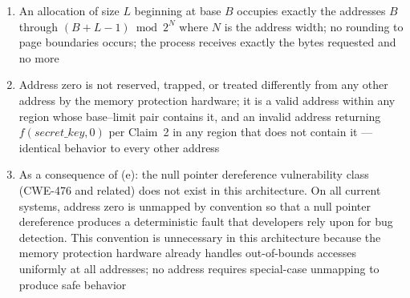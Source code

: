 \documentclass[12pt,letterpaper]{article}
\begin{document}
\begin{enumerate}[label=(\alph*),noitemsep]
        \textit{Note on naive implementation.}
        The intuitively obvious alternative --- two separate
        comparisons:
        \begin{lstlisting}
// WRONG: does not form a ring
if (address >= base && address < base + limit) { valid }
        \end{lstlisting}
        produces a linear region with two hard endpoints.
        It does not handle allocations that cross the wraparound
        boundary: an allocation beginning near the top of the
        address space and extending past $2^N - 1$ back toward
        zero will be incorrectly rejected or require an explicit
        branch to detect and handle the wraparound case.
        Adding that branch is simply implementing unsigned modular
        subtraction the hard way, at the cost of extra logic and
        a conditional that the subtract-compare eliminates entirely.
        The correct single-instruction form is:
        \begin{lstlisting}
// CORRECT: forms a ring, handles wraparound by construction
if ((address - base) < limit) { valid }  // all unsigned
        \end{lstlisting}
        where all values are treated as unsigned integers and
        subtraction is allowed to wrap. This is not a
        micro-optimization --- it is the difference between
        a system with two detectable endpoints and a uniform
        address space with none

  \item An allocation of size $L$ beginning at base $B$ occupies
        exactly the addresses $B$ through $(B + L - 1) \bmod 2^N$
        where $N$ is the address width; no rounding to page
        boundaries occurs; the process receives exactly the bytes
        requested and no more

  \item Address zero is not reserved, trapped, or treated
        differently from any other address by the memory protection
        hardware; it is a valid address within any region whose
        base--limit pair contains it, and an invalid address
        returning $f(\textit{secret\_key}, 0)$ per Claim~2
        in any region that does not contain it --- identical
        behavior to every other address

  \item As a consequence of (e): the null pointer dereference
        vulnerability class (CWE-476 and related) does not exist
        in this architecture. On all current systems, address zero
        is unmapped by convention so that a null pointer dereference
        produces a deterministic fault that developers rely upon for
        bug detection. This convention is unnecessary in this
        architecture because the memory protection hardware already
        handles out-of-bounds accesses uniformly at all addresses;
        no address requires special-case unmapping to produce safe
        behavior
\end{enumerate}
\end{document}
